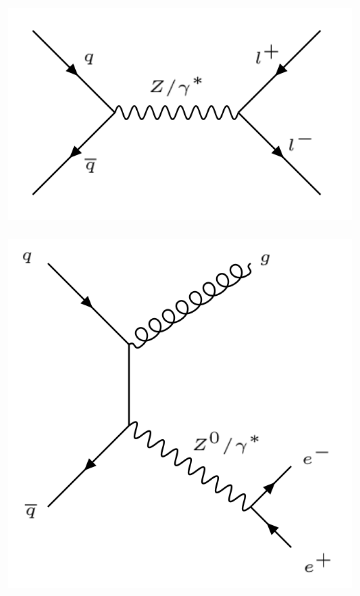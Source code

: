 \documentclass{article}
\begin{document}
\begin{figure}[h]
    \centering
    \begin{subfigure}{.25\textwidth}
        \includegraphics[scale = 0.2]{images/DY.png}
        \caption{}
        \label{fig:bckgFeynman_DY}
    \end{subfigure}
    \begin{subfigure}{.25\textwidth}
        \includegraphics[height=\textwidth]{images/DY_bck.png}
        \caption{}
        \label{fig:bckgFeynman_DY_bck}
    \end{subfigure}    	
    \begin{subfigure}{.35\textwidth}

\end{subfigure}
\end{figure}
\end{document}
